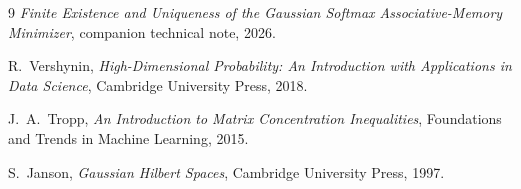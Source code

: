 \documentclass[11pt]{article}
\theoremstyle{definition}
\begin{document}
\begin{thebibliography}{9}
\emph{Finite Existence and Uniqueness of the Gaussian Softmax
Associative-Memory Minimizer}, companion technical note, 2026.

R.~Vershynin,
\emph{High-Dimensional Probability: An Introduction with Applications
in Data Science}, Cambridge University Press, 2018.

J.~A.~Tropp,
\emph{An Introduction to Matrix Concentration Inequalities},
Foundations and Trends in Machine Learning, 2015.

S.~Janson,
\emph{Gaussian Hilbert Spaces}, Cambridge University Press, 1997.
\end{thebibliography}
\end{document}
